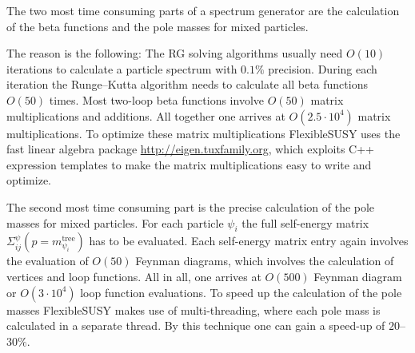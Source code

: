 \documentclass[final,3p,times,pdflatex]{elsarticle}
\begin{document}
The two most time consuming parts of a spectrum generator are the
calculation of the beta functions and the pole masses for mixed
particles.

The reason is the following: The RG solving algorithms usually need
$O(10)$ iterations to calculate a particle spectrum with $0.1\%$
precision.  During each iteration the Runge--Kutta algorithm needs to
calculate all beta functions $O(50)$ times.  Most two-loop beta
functions involve $O(50)$ matrix multiplications and additions.  All
together one arrives at $O(2.5\cdot 10^4)$ matrix multiplications.  To
optimize these matrix multiplications FlexibleSUSY uses the fast
linear algebra package \href{Eigen}{http://eigen.tuxfamily.org}, which
exploits C++ expression templates to make the matrix multiplications
easy to write and optimize.

The second most time consuming part is the precise calculation of the
pole masses for mixed particles.  For each particle $\psi_i$ the full
self-energy matrix $\Sigma^\psi_{ij}(p=m^\text{tree}_{\psi_i})$ has to
be evaluated.  Each self-energy matrix entry again involves the
evaluation of $O(50)$ Feynman diagrams, which involves the calculation
of vertices and loop functions.  All in all, one arrives at $O(500)$
Feynman diagram or $O(3\cdot 10^4)$ loop function evaluations.  To
speed up the calculation of the pole masses FlexibleSUSY makes use of
multi-threading, where each pole mass is calculated in a separate
thread.  By this technique one can gain a speed-up of $20$--$30\%$.
\end{document}
